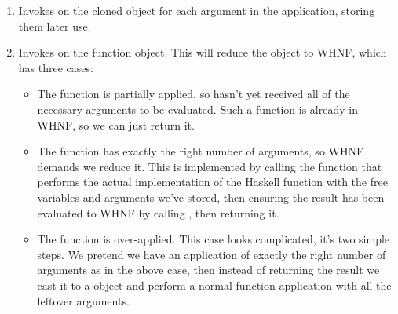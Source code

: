 \documentclass[dissertation.tex]{subfiles}
\begin{document}
{{{\begin{enumerate}
{                Cloning the function essentially maintains the same references to arguments and free variables, but
                creates new (non-shared) containers to hold them, avoiding the above issue.
                
                This is a shallow clone -- if we used a deep clone, recursively cloning the arguments and free
                variables, then we'd lose the performance benefit of graph reduction where we can use an already
                computed value instead of recomputing it ourselves, and increase memory usage.

            }
            \item
            {

                Invokes  on the cloned object for each argument in the application, storing them
                later use.

            }
            \item
            {

                Invokes  on the function object. This will reduce the object to WHNF, which has three
                cases:
                
                \begin{itemize}
                \item
                {

                    The function is partially applied, so hasn't yet received all of the necessary arguments to be
                    evaluated. Such a function is already in WHNF, so we can just return it.

                }
                \item
                {

                    The function has exactly the right number of arguments, so WHNF demands we reduce it. This is
                    implemented by calling the  function that performs the actual implementation of the
                    Haskell function with the free variables and arguments we've stored, then ensuring the result
                    has been evaluated to WHNF by calling , then returning it.

                }
                \item
                {

                    The function is over-applied. This case looks complicated, it's two simple steps. We pretend we
                    have an application of exactly the right number of arguments as in the above case, then instead
                    of returning the result we cast it to a  object and perform a normal function
                    application with all the leftover arguments.

}
\end{itemize}}
\end{enumerate}}}}
\end{document}

